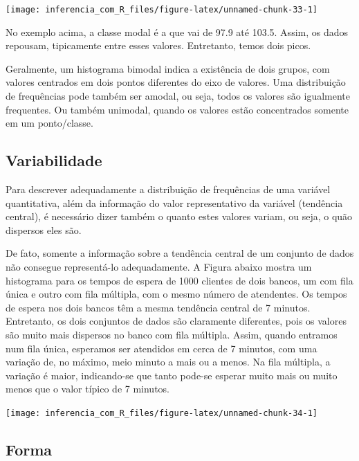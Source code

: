 \documentclass[
]{book}
\begin{document}
\begin{center}\texttt{[image: inferencia\_com\_R\_files/figure-latex/unnamed-chunk-33-1]} \end{center}

No exemplo acima, a classe modal é a que vai de 97.9 até 103.5. Assim, os dados repousam, tipicamente entre esses valores. Entretanto, temos dois picos.

Geralmente, um histograma bimodal indica a existência de dois grupos, com valores centrados em dois pontos diferentes do eixo de valores. Uma distribuição de frequências pode também ser amodal, ou seja, todos os valores são igualmente frequentes. Ou também unimodal, quando os valores estão concentrados somente em um ponto/classe.

\hypertarget{variabilidade}{%
\subsection{Variabilidade}\label{variabilidade}}

Para descrever adequadamente a distribuição de frequências de uma variável quantitativa, além da informação do valor representativo da variável (tendência central), é necessário dizer também o quanto estes valores variam, ou seja, o quão dispersos eles são.

De fato, somente a informação sobre a tendência central de um conjunto de dados não consegue representá-lo adequadamente. A Figura abaixo mostra um histograma para os tempos de espera de 1000 clientes de dois bancos, um com fila única e outro com fila múltipla, com o mesmo número de atendentes. Os tempos de espera nos dois bancos têm a mesma tendência central de 7 minutos. Entretanto, os dois conjuntos de dados são claramente diferentes, pois os valores são muito mais dispersos no banco com fila múltipla. Assim, quando entramos num fila única, esperamos ser atendidos em cerca de 7 minutos, com uma variação de, no máximo, meio minuto a mais ou a menos. Na fila múltipla, a variação é maior, indicando-se que tanto pode-se esperar muito mais ou muito menos que o valor típico de 7 minutos.

\begin{center}\texttt{[image: inferencia\_com\_R\_files/figure-latex/unnamed-chunk-34-1]} \end{center}

\hypertarget{forma}{%
\subsection{Forma}\label{forma}}
\end{document}
